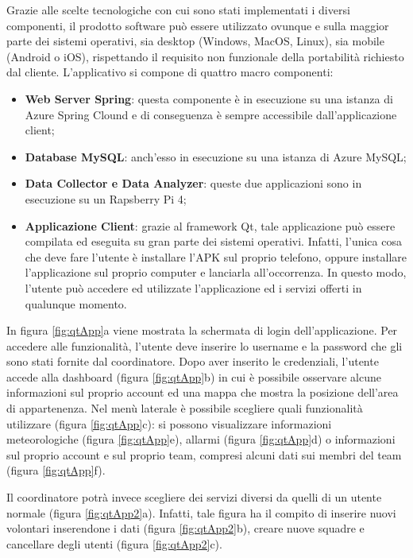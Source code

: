 
Grazie alle scelte tecnologiche con cui sono stati implementati i diversi componenti, il prodotto software può essere utilizzato ovunque e sulla maggior parte dei sistemi operativi, sia desktop (Windows, MacOS, Linux), sia mobile (Android o iOS), rispettando il requisito non funzionale della portabilità richiesto dal cliente.
L'applicativo si compone di quattro macro componenti:
\begin{itemize}
	\item \textbf{Web Server Spring}: questa componente è in esecuzione su una istanza di Azure Spring Clound e di conseguenza è sempre accessibile dall'applicazione client;
	\item \textbf{Database MySQL}: anch'esso in esecuzione su una istanza di Azure MySQL;
	\item \textbf{Data Collector e Data Analyzer}: queste due applicazioni sono in esecuzione su un Rapsberry Pi 4;
	\item \textbf{Applicazione Client}: grazie al framework Qt, tale applicazione può essere compilata ed eseguita su gran parte dei sistemi operativi. Infatti, l'unica cosa che deve fare l'utente è installare l'APK sul proprio telefono, oppure installare l'applicazione sul proprio computer e lanciarla all'occorrenza. In questo modo, l'utente può accedere ed utilizzate l'applicazione ed i servizi offerti in qualunque momento. 
\end{itemize}

In figura \ref{fig:qtApp}a viene mostrata la schermata di login dell'applicazione. Per accedere alle funzionalità, l'utente deve inserire lo username e la password che gli sono stati fornite dal coordinatore. 
Dopo aver inserito le credenziali, l'utente accede alla dashboard (figura \ref{fig:qtApp}b) in cui è possibile osservare alcune informazioni sul proprio account ed una mappa che mostra la posizione dell'area di appartenenza.
Nel menù laterale è possibile scegliere quali funzionalità utilizzare (figura \ref{fig:qtApp}c): si possono visualizzare informazioni meteorologiche (figura \ref{fig:qtApp}e), allarmi (figura \ref{fig:qtApp}d) o informazioni sul proprio account e sul proprio team, compresi alcuni dati sui membri del team (figura \ref{fig:qtApp}f).

Il coordinatore potrà invece scegliere dei servizi diversi da quelli di un utente normale (figura \ref{fig:qtApp2}a). Infatti, tale figura ha il compito di inserire nuovi volontari inserendone i dati (figura \ref{fig:qtApp2}b), creare nuove squadre e cancellare degli utenti (figura \ref{fig:qtApp2}c).

